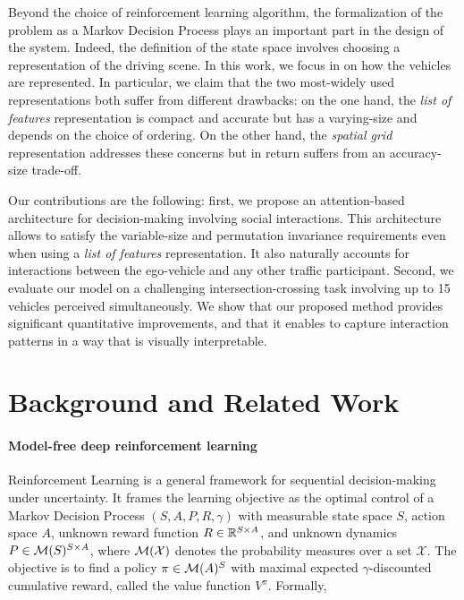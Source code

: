 \documentclass{article}
\begin{document}
Beyond the choice of reinforcement learning algorithm, the formalization of the problem as a Markov Decision Process plays an important part in the design of the system. Indeed, the definition of the state space involves choosing a representation of the driving scene. In this work, we focus in on how the vehicles are represented. In particular, we claim that the two most-widely used representations both suffer from different drawbacks: on the one hand, the \emph{list of features} representation is compact and accurate but has a varying-size and depends on the choice of ordering. On the other hand, the \emph{spatial grid} representation addresses these concerns but in return suffers from an accuracy-size trade-off.

Our contributions are the following: first, we propose an attention-based architecture for decision-making involving social interactions. This architecture allows to satisfy the variable-size and permutation invariance requirements even when using a \emph{list of features} representation. It also naturally accounts for interactions between the ego-vehicle and any other traffic participant.
Second, we evaluate our model on a challenging intersection-crossing task involving up to 15 vehicles perceived simultaneously. We show that our proposed method provides significant quantitative improvements, and that it enables to capture interaction patterns in a way that is visually interpretable.

\section{Background and Related Work}

\label{sec:background}

\paragraph{Model-free deep reinforcement learning} Reinforcement Learning is a general framework for sequential decision-making under uncertainty. It frames the learning objective as the optimal control of a Markov Decision Process $(S, A, P, R, \gamma)$ with measurable state space $S$, action space $A$, unknown reward function $R\in\mathbb{R}^{S \times A}$, and unknown dynamics $P\in \mathcal{M}(S)^{S \times A}$, where $\mathcal{M}(\mathcal{X})$ denotes the probability measures over a set $\mathcal{X}$. The objective is to find a policy $\pi\in\mathcal{M}(A)^S$ with maximal expected $\gamma$-discounted cumulative reward, called the value function $V^\pi$. Formally,
\end{document}
